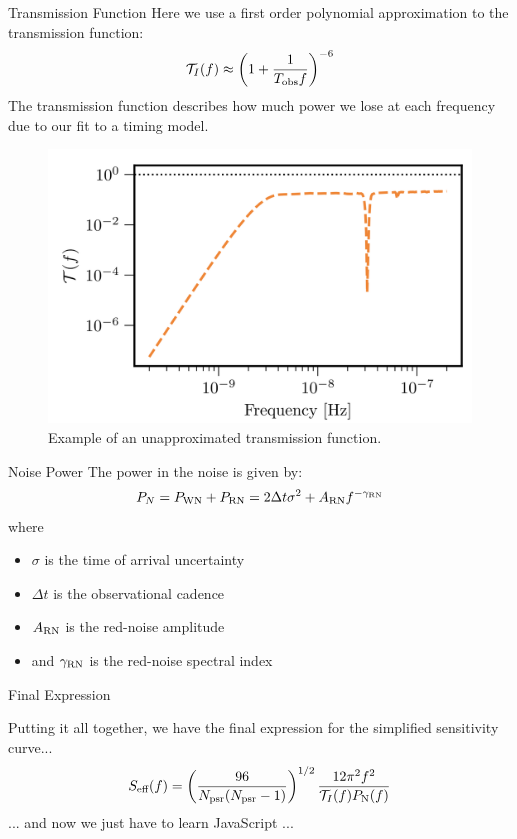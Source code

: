 \documentclass{beamer}
\begin{document}
\begin{frame}{Transmission Function}
    Here we use a first order polynomial approximation to the transmission function:
    \[
    \mathcal{T}_I(f) \approx \left(1 + \frac{1}{T_{\rm obs}f}\right)^{-6}
    \]
    The transmission function describes how much power we lose at each frequency due to our fit to a timing model.
    \begin{figure}
        \centering
        \includegraphics[width=0.5\linewidth]{figs/transmission_function.png}
        \caption{Example of an unapproximated transmission function.}
        \label{fig:transmission_function}
    \end{figure}
\end{frame}


\begin{frame}{Noise Power}
    The power in the noise is given by:
    \[
    P_{N} = P_{\rm WN} + P_{\rm RN} = 2\Delta t\sigma^2 + A_{\rm RN}f^{-\gamma_{\rm RN}}
    \]
    where 
    \begin{itemize}
        \item $\sigma$ is the time of arrival uncertainty
        \item $\Delta t$ is the observational cadence
        \item $A_{\rm RN}$ is the red-noise amplitude
        \item and $\gamma_{\rm RN}$ is the red-noise spectral index
    \end{itemize}
\end{frame}

\begin{frame}{Final Expression}

    Putting it all together, we have the final expression for the simplified sensitivity curve...
    \[
    S_{\text{eff}}(f) = \left(\frac{96}{N_{\rm psr}(N_{\rm psr}-1)}\right)^{1/2} \frac{12\pi^2f^2}{\mathcal{T}_I(f)P_{\rm N}(f)}
    \]
    \pause
    \newline
    ... and now we just have to learn JavaScript ...

\end{frame}
\end{document}

